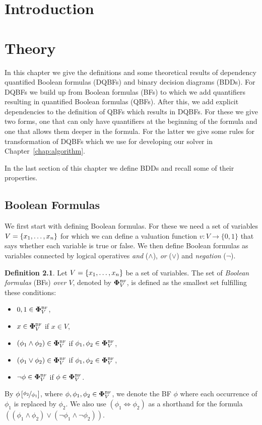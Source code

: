 \documentclass[
  digital, %
  twoside, %
  table,   %
  nolof,     %
  nolot,     %
]{fithesis3}
\let\setbuilder\set
\newcommand{\simpleset}[1]{\{{#1}\}}
\renewcommand{\set}[1]{\normalexpandarg\IfSubStr{#1}{|}{\setbuilder{#1}}{\simpleset{#1}}}
\theoremstyle{definition}
\newtheorem{definition}{Definition}
\theoremstyle{remark}
\newcommand{\substitute}[2]{\left[ \nicefrac{#2}{#1} \right]}
\newcommand{\BF}[1]{\mathbf{\Phi}_{#1}^{\normalfont{\text{\tiny BF}}}}
\newcommand{\lequal}{\Leftrightarrow}
\begin{document}
\chapter{Introduction}

\chapter{Theory}
In this chapter we give the definitions and some theoretical results of dependency quantified Boolean formulas (DQBFs) and binary decision diagrams (BDDs). For DQBFs we build up from Boolean formulas (BFs) to which we add quantifiers resulting in quantified Boolean formulas (QBFs). After this, we add explicit dependencies to the definition of QBFs which results in DQBFs. For these we give two forms, one that can only have quantifiers at the beginning of the formula and one that allows them deeper in the formula. For the latter we give some rules for transformation of DQBFs which we use for developing our solver in Chapter~\ref{chap:algorithm}. 

In the last section of this chapter we define BDDs and recall some of their properties.

\section{Boolean Formulas}
We first start with defining Boolean formulas. For these we need a set of variables $V = \set{x_1, \dots, x_n}$ for which we can define a valuation function $v\colon V \to \{0,1\}$ that says whether each variable is true or false. We then define Boolean formulas as variables connected by logical operatives \emph{and} (${\land}$), \emph{or} (${\lor}$) and \emph{negation} (${\neg}$).

\begin{definition}
Let $V = \set{x_1, \dots, x_n}$ be a set of variables. The set of \emph{Boolean formulas} (BFs) \emph{over $V$}, denoted by $\BF{V}$, is defined as the smallest set fulfilling these conditions:
\begin{itemize}
    \item $0,1 \in \BF{V}$,
    \item $x \in \BF{V}$ if $x \in V$,
    \item $(\phi_1 \land \phi_2) \in \BF{V}$ if $\phi_1, \phi_2 \in \BF{V}$,
    \item $(\phi_1 \lor \phi_2) \in \BF{V}$ if $\phi_1, \phi_2 \in \BF{V}$,
    \item $\neg\phi \in \BF{V}$ if $\phi \in \BF{V}$.
\end{itemize}
\end{definition}
By $\phi\substitute{\phi_1}{\phi_2}$, where $\phi,\phi_1,\phi_2 \in \BF{V}$, we denote the BF $\phi$ where each occurrence of $\phi_1$ is replaced by $\phi_2$. We also use $(\phi_1 \lequal \phi_2)$ as a shorthand for the formula $((\phi_1 \land \phi_2) \lor (\neg \phi_1 \land \neg \phi_2))$.
\end{document}

